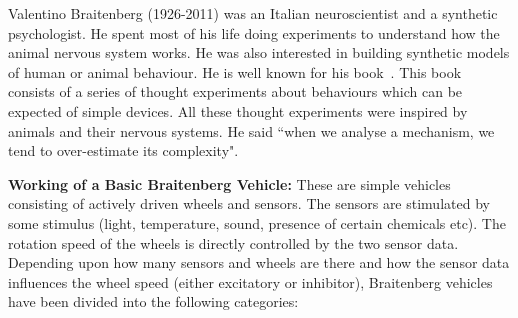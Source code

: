 \documentclass[main.tex]{subfiles}
\begin{document}
    Valentino Braitenberg (1926-2011) was an Italian neuroscientist and a synthetic psychologist. He spent most of his life doing experiments to understand how the animal nervous system works. He was also interested in building synthetic models of human or animal behaviour. He is well known for his book~\cite{braitenberg1986vehicles}. This book consists of a series of thought experiments about behaviours which can be expected of simple devices. All these thought experiments were inspired by animals and their nervous systems. He said ``when we analyse a mechanism, we tend to over-estimate its complexity".

    \textbf{Working of a Basic Braitenberg Vehicle:} These are simple vehicles consisting of actively driven wheels and sensors. The sensors are stimulated by some stimulus (light, temperature, sound, presence of certain chemicals etc). The rotation speed of the wheels is directly controlled by the two sensor data. Depending upon how many sensors and wheels are there and how the sensor data influences the wheel speed (either excitatory or inhibitor), Braitenberg vehicles have been divided into the following categories:
\end{document}
